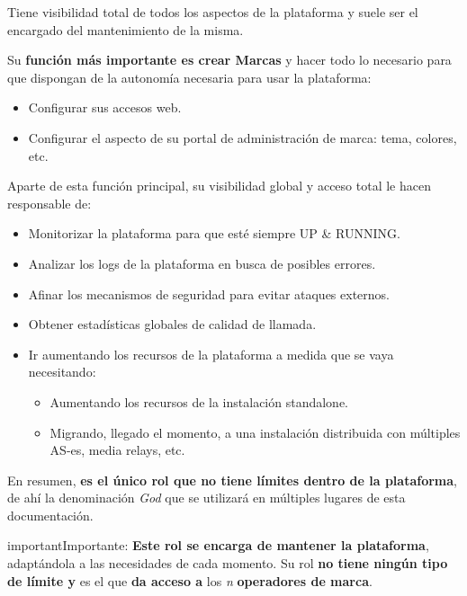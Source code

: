 \documentclass[letterpaper,10pt,spanish]{sphinxmanual}
\begin{document}
Tiene visibilidad total de todos los aspectos de la plataforma y suele ser el encargado del mantenimiento de la misma.

Su \textbf{función más importante es crear Marcas} y hacer todo lo necesario para que dispongan de la autonomía necesaria para usar la plataforma:
\begin{itemize}
\item {} 
Configurar sus accesos web.

\item {} 
Configurar el aspecto de su portal de administración de marca: tema, colores, etc.

\end{itemize}

Aparte de esta función principal, su visibilidad global y acceso total le hacen responsable de:
\begin{itemize}
\item {} 
Monitorizar la plataforma para que esté siempre UP \& RUNNING.

\item {} 
Analizar los logs de la plataforma en busca de posibles errores.

\item {} 
Afinar los mecanismos de seguridad para evitar ataques externos.

\item {} 
Obtener estadísticas globales de calidad de llamada.

\item {} 
Ir aumentando los recursos de la plataforma a medida que se vaya necesitando:
\begin{itemize}
\item {} 
Aumentando los recursos de la instalación standalone.

\item {} 
Migrando, llegado el momento, a una instalación distribuida con múltiples AS-es, media relays, etc.

\end{itemize}

\end{itemize}

En resumen, \textbf{es el único rol que no tiene límites dentro de la plataforma}, de ahí la denominación \emph{God} que se utilizará en múltiples lugares de esta documentación.

\begin{notice}{important}{Importante:}
\textbf{Este rol se encarga de mantener la plataforma}, adaptándola a las necesidades de cada momento. Su rol \textbf{no tiene ningún tipo de límite y} es el que \textbf{da acceso a} los \emph{n} \textbf{operadores de marca}.
\end{notice}
\end{document}
